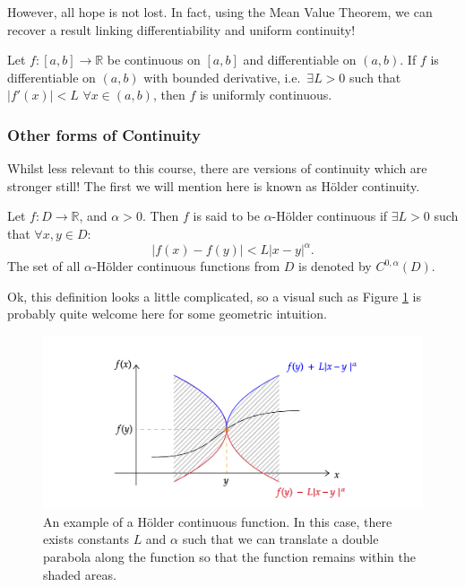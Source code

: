 \documentclass[
  17pt,
  a4paper]{extarticle}
\theoremstyle{plain}
\theoremstyle{definition}
\theoremstyle{plain}
\theoremstyle{plain}
\theoremstyle{plain}
\theoremstyle{plain}
\theoremstyle{definition}
\theoremstyle{definition}
\theoremstyle{remark}
\theoremstyle{remark}
\let\BeginKnitrBlock\begin \let\EndKnitrBlock\end
\renewcommand{\;}{\,}
\begin{document}
However, all hope is not lost. In fact, using the Mean Value Theorem, we can recover a result linking differentiability and uniform continuity!

\BeginKnitrBlock{proposition}
{\label{prp:prop3} }Let \(f:[a,b] \to \mathbb{R}\) be continuous on \([a,b]\) and differentiable on \((a,b).\) If \(f\) is differentiable on \((a,b)\) with bounded derivative, i.e.~\(\exists L > 0\) such that \(\lvert f'(x) \rvert < L \;\;\forall x \in (a,b)\), then \(f\) is uniformly continuous.
\EndKnitrBlock{proposition}

\hypertarget{other-forms-of-continuity}{%
\subsubsection{Other forms of Continuity}\label{other-forms-of-continuity}}

Whilst less relevant to this course, there are versions of continuity which are stronger still! The first we will mention here is known as Hölder continuity.

\BeginKnitrBlock{definition}[Hölder Continuity]
{\label{def:def5} }Let \(f:D \to \mathbb{R}\), and \(\alpha>0\). Then \(f\) is said to be \(\alpha\)-Hölder continuous if \(\exists L > 0\) such that \(\forall x,y \in D\): \[\lvert f(x) - f(y) \rvert < L \lvert x - y \rvert^{\alpha}.\] The set of all \(\alpha\)-Hölder continuous functions from \(D\) is denoted by \(C^{0,\alpha}\left(D\right).\)
\EndKnitrBlock{definition}

Ok, this definition looks a little complicated, so a visual such as Figure \ref{fig:Holder} is probably quite welcome here for some geometric intuition.

\begin{figure}

{\centering \includegraphics[width=\Width,height=\Height]{Holder} 

}

\caption{An example of a Hölder continuous function. In this case, there exists constants $L$ and $\alpha$ such that we can translate a double parabola along the function so that the function remains within the shaded areas.}\label{fig:Holder}
\end{figure}
\end{document}
